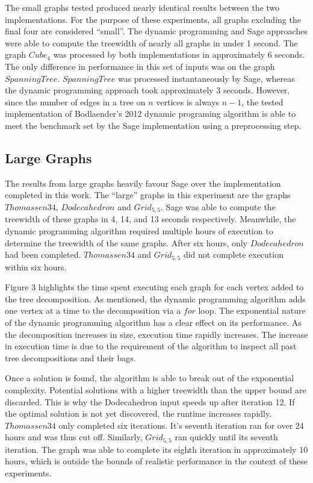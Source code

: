 \documentclass[12pt,conference]{IEEEtran}
\theoremstyle{plain}
\begin{document}
The small graphs tested produced nearly identical results between the two implementations. For the purpose of these experiments, all graphs excluding the final four are considered ``small''. The dynamic programming and Sage approaches were able to compute the treewidth of nearly all graphs in under 1 second. The graph $Cube_{4}$ was processed by both implementations in approximately 6 seconds. The only difference in performance in this set of inputs was on the graph $Spanning Tree$. $Spanning Tree$ was processed instantaneously by Sage, whereas the dynamic programming approach took approximately 3 seconds. However, since the number of edges in a tree on $n$ vertices is always $n-1$, the tested implementation of Bodlaender's 2012 dynamic programing algorithm is able to meet the benchmark set by the Sage implementation using a preprocessing step.

\subsection{Large Graphs}

The results from large graphs heavily favour Sage over the implementation completed in this work. The ``large'' graphs in this experiment are the graphs $Thomassen34$, $Dodecahedron$ and $Grid_{5,5}$. Sage was able to compute the treewidth of these graphs in 4, 14, and 13 seconds respectively. Meanwhile, the dynamic programming algorithm required multiple hours of execution to determine the treewidth of the same graphs. After six hours, only $Dodecahedron$ had been completed. $Thomassen34$ and $Grid_{5,5}$ did not complete execution within six hours.

Figure 3 highlights the time spent executing each graph for each vertex added to the tree decomposition. As mentioned, the dynamic programming algorithm adds one vertex at a time to the decomposition via a $for$ loop. The exponential nature of the dynamic programming algorithm has a clear effect on its performance. As the decomposition increases in size, execution time rapidly increases. The increase in execution time is due to the requirement of the algorithm to inspect all past tree decompositions and their bags.

Once a solution is found, the algorithm is able to break out of the exponential complexity. Potential solutions with a higher treewidth than the upper bound are discarded. This is why the Dodecahedron input speeds up after iteration 12. If the optimal solution is not yet discovered, the runtime increases rapidly. $Thomassen34$ only completed six iterations. It's seventh iteration ran for over 24 hours and was thus cut off. Similarly, $Grid_{5,5}$ ran quickly until its seventh iteration. The graph was able to complete its eighth iteration in approximately 10 hours, which is outside the bounds of realistic performance in the context of these experiments.
\end{document}
